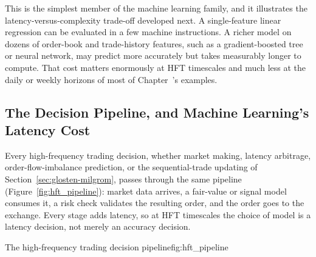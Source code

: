\documentclass[../ai_in_finance]{subfiles}
\begin{document}
This is the simplest member of the machine learning family, and it illustrates the latency-versus-complexity trade-off developed next. A single-feature linear regression can be evaluated in a few machine instructions. A richer model on dozens of order-book and trade-history features, such as a gradient-boosted tree or neural network, may predict more accurately but takes measurably longer to compute. That cost matters enormously at HFT timescales and much less at the daily or weekly horizons of most of Chapter~'s examples.

\subsection{The Decision Pipeline, and Machine Learning's Latency Cost}

Every high-frequency trading decision, whether market making, latency arbitrage, order-flow-imbalance prediction, or the sequential-trade updating of Section~\ref{sec:glosten-milgrom}, passes through the same pipeline (Figure~\ref{fig:hft_pipeline}): market data arrives, a fair-value or signal model consumes it, a risk check validates the resulting order, and the order goes to the exchange. Every stage adds latency, so at HFT timescales the choice of model is a latency decision, not merely an accuracy decision.

\begin{bookfigure}[htbp]{The high-frequency trading decision pipeline}{fig:hft_pipeline}
\end{bookfigure}
\end{document}
